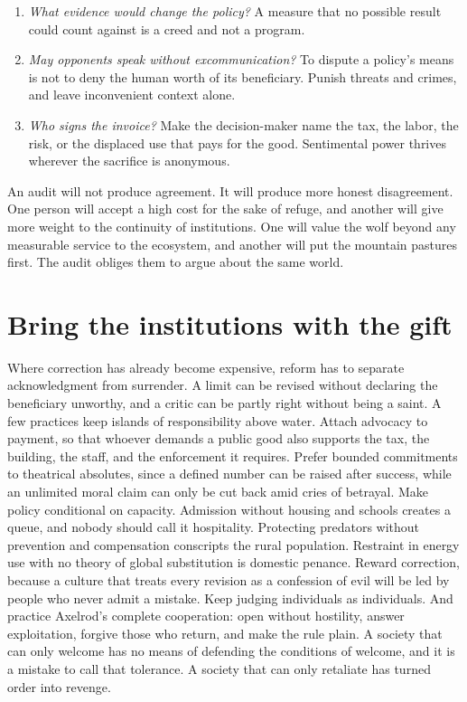 \documentclass[12pt,a4paper]{book}
\begin{document}
\begin{enumerate}
\item \emph{What evidence would change the policy?} A measure that no possible result could count against is a creed and not a program.
\item \emph{May opponents speak without excommunication?} To dispute a policy's means is not to deny the human worth of its beneficiary. Punish threats and crimes, and leave inconvenient context alone.
\item \emph{Who signs the invoice?} Make the decision-maker name the tax, the labor, the risk, or the displaced use that pays for the good. Sentimental power thrives wherever the sacrifice is anonymous.
\end{enumerate}

An audit will not produce agreement. It will produce more honest disagreement. One person will accept a high cost for the sake of refuge, and another will give more weight to the continuity of institutions. One will value the wolf beyond any measurable service to the ecosystem, and another will put the mountain pastures first. The audit obliges them to argue about the same world.

\section{Bring the institutions with the gift}

Where correction has already become expensive, reform has to separate acknowledgment from surrender. A limit can be revised without declaring the beneficiary unworthy, and a critic can be partly right without being a saint. A few practices keep islands of responsibility above water. Attach advocacy to payment, so that whoever demands a public good also supports the tax, the building, the staff, and the enforcement it requires. Prefer bounded commitments to theatrical absolutes, since a defined number can be raised after success, while an unlimited moral claim can only be cut back amid cries of betrayal. Make policy conditional on capacity. Admission without housing and schools creates a queue, and nobody should call it hospitality. Protecting predators without prevention and compensation conscripts the rural population. Restraint in energy use with no theory of global substitution is domestic penance. Reward correction, because a culture that treats every revision as a confession of evil will be led by people who never admit a mistake. Keep judging individuals as individuals. And practice Axelrod's complete cooperation: open without hostility, answer exploitation, forgive those who return, and make the rule plain. A society that can only welcome has no means of defending the conditions of welcome, and it is a mistake to call that tolerance. A society that can only retaliate has turned order into revenge.
\end{document}
